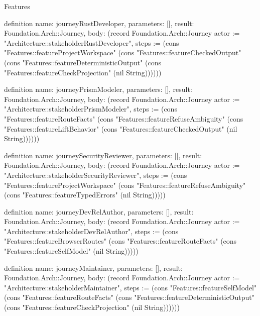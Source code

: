 \begin{lexlean}{Features}
\begin{semanticmodule}
definition{
  name: journeyRustDeveloper,
  parameters: [],
  result: Foundation.Arch::Journey,
  body: (record Foundation.Arch::Journey {actor := "Architecture::stakeholderRustDeveloper", steps := (cons "Features::featureProjectWorkspace" (cons "Features::featureCheckedOutput" (cons "Features::featureDeterministicOutput" (cons "Features::featureCheckProjection" (nil String)))))})
}

definition{
  name: journeyPrismModeler,
  parameters: [],
  result: Foundation.Arch::Journey,
  body: (record Foundation.Arch::Journey {actor := "Architecture::stakeholderPrismModeler", steps := (cons "Features::featureRouteFacts" (cons "Features::featureRefuseAmbiguity" (cons "Features::featureLiftBehavior" (cons "Features::featureCheckedOutput" (nil String)))))})
}

definition{
  name: journeySecurityReviewer,
  parameters: [],
  result: Foundation.Arch::Journey,
  body: (record Foundation.Arch::Journey {actor := "Architecture::stakeholderSecurityReviewer", steps := (cons "Features::featureProjectWorkspace" (cons "Features::featureRefuseAmbiguity" (cons "Features::featureTypedErrors" (nil String))))})
}

definition{
  name: journeyDevRelAuthor,
  parameters: [],
  result: Foundation.Arch::Journey,
  body: (record Foundation.Arch::Journey {actor := "Architecture::stakeholderDevRelAuthor", steps := (cons "Features::featureBrowserRoutes" (cons "Features::featureRouteFacts" (cons "Features::featureSelfModel" (nil String))))})
}

definition{
  name: journeyMaintainer,
  parameters: [],
  result: Foundation.Arch::Journey,
  body: (record Foundation.Arch::Journey {actor := "Architecture::stakeholderMaintainer", steps := (cons "Features::featureSelfModel" (cons "Features::featureRouteFacts" (cons "Features::featureDeterministicOutput" (cons "Features::featureCheckProjection" (nil String)))))})
}


\end{semanticmodule}
\end{lexlean}
